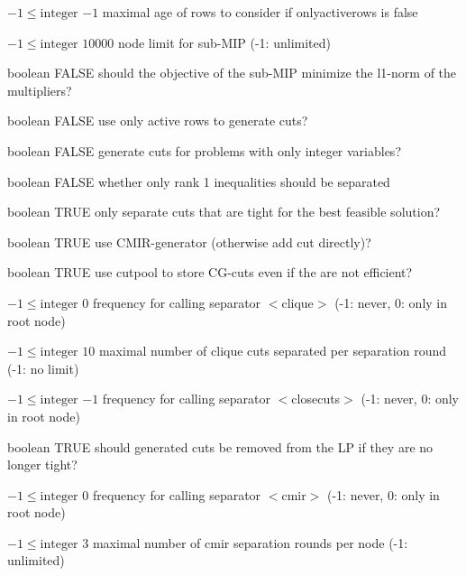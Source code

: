 %
{$-1\leq\textrm{integer}$}%
{$-1$}%
{maximal age of rows to consider if onlyactiverows is false}%
{}

%
{$-1\leq\textrm{integer}$}%
{$10000$}%
{node limit for sub-MIP (-1: unlimited)}%
{}

%
{boolean}%
{FALSE}%
{should the objective of the sub-MIP minimize the l1-norm of the multipliers?}%
{}

%
{boolean}%
{FALSE}%
{use only active rows to generate cuts?}%
{}

%
{boolean}%
{FALSE}%
{generate cuts for problems with only integer variables?}%
{}

%
{boolean}%
{FALSE}%
{whether only rank 1 inequalities should be separated}%
{}

%
{boolean}%
{TRUE}%
{only separate cuts that are tight for the best feasible solution?}%
{}

%
{boolean}%
{TRUE}%
{use CMIR-generator (otherwise add cut directly)?}%
{}

%
{boolean}%
{TRUE}%
{use cutpool to store CG-cuts even if the are not efficient?}%
{}

%
{$-1\leq\textrm{integer}$}%
{$0$}%
{frequency for calling separator $<$clique$>$ (-1: never, 0: only in root node)}%
{}

%
{$-1\leq\textrm{integer}$}%
{$10$}%
{maximal number of clique cuts separated per separation round (-1: no limit)}%
{}

%
{$-1\leq\textrm{integer}$}%
{$-1$}%
{frequency for calling separator $<$closecuts$>$ (-1: never, 0: only in root node)}%
{}

%
{boolean}%
{TRUE}%
{should generated cuts be removed from the LP if they are no longer tight?}%
{}

%
{$-1\leq\textrm{integer}$}%
{$0$}%
{frequency for calling separator $<$cmir$>$ (-1: never, 0: only in root node)}%
{}

%
{$-1\leq\textrm{integer}$}%
{$3$}%
{maximal number of cmir separation rounds per node (-1: unlimited)}%
{}

